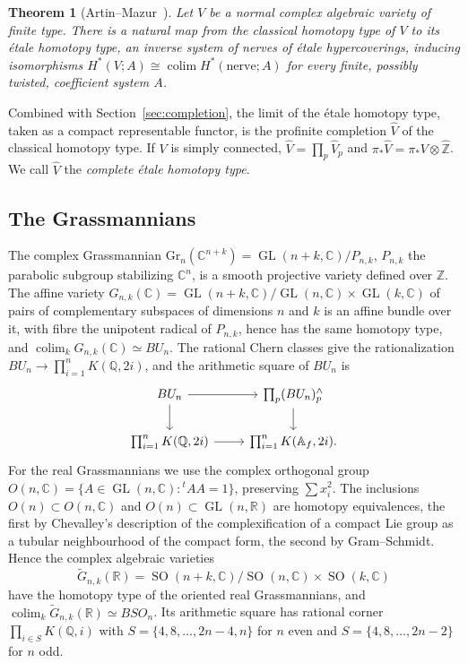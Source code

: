 \documentclass[11pt]{amsart}
\theoremstyle{plain}
\newtheorem{theorem}{Theorem}[section]
\theoremstyle{definition}
\numberwithin{equation}{section}
\newcommand{\Z}{\mathbb{Z}}
\newcommand{\Q}{\mathbb{Q}}
\newcommand{\R}{\mathbb{R}}
\newcommand{\C}{\mathbb{C}}
\newcommand{\Zhat}{\widehat{\mathbb{Z}}}
\newcommand{\Af}{\mathbb{A}_f}
\DeclareMathOperator{\colim}{colim}
\DeclareMathOperator{\GL}{GL}
\DeclareMathOperator{\SO}{SO}
\begin{document}
\begin{theorem}[Artin--Mazur~\cite{ArtinMazur}]\label{thm:artinmazur}
Let $V$ be a normal complex algebraic variety of finite type.
There is a natural map from the classical homotopy type of $V$ to its \'etale homotopy type, an inverse system of nerves of \'etale hypercoverings, inducing isomorphisms $H^*(V;A)\cong\colim H^*(\text{nerve};A)$ for every finite, possibly twisted, coefficient system $A$.
\end{theorem}

Combined with Section~\ref{sec:completion}, the limit of the \'etale homotopy type, taken as a compact representable functor, is the profinite completion $\widehat V$ of the classical homotopy type.
If $V$ is simply connected, $\widehat V=\prod_p\widehat V_p$ and $\pi_*\widehat V=\pi_*V\otimes\Zhat$.
We call $\widehat V$ the \emph{complete \'etale homotopy type}.

\subsection{The Grassmannians}
The complex Grassmannian $\mathrm{Gr}_n(\C^{n+k})=\GL(n+k,\C)/P_{n,k}$, $P_{n,k}$ the parabolic subgroup stabilizing $\C^n$, is a smooth projective variety defined over $\Z$.
The affine variety $G_{n,k}(\C)=\GL(n+k,\C)/\GL(n,\C)\times\GL(k,\C)$ of pairs of complementary subspaces of dimensions $n$ and $k$ is an affine bundle over it, with fibre the unipotent radical of $P_{n,k}$, hence has the same homotopy type, and $\colim_kG_{n,k}(\C)\simeq BU_n$.
The rational Chern classes give the rationalization $BU_n\to\prod_{i=1}^nK(\Q,2i)$, and the arithmetic square of $BU_n$ is
\[
\begin{tikzcd}
BU_n\arrow[r]\arrow[d] & \prod_p(BU_n)^\wedge_p\arrow[d]\\
\prod_{i=1}^nK(\Q,2i)\arrow[r] & \prod_{i=1}^nK(\Af,2i).
\end{tikzcd}
\]
For the real Grassmannians we use the complex orthogonal group $O(n,\C)=\{A\in\GL(n,\C):{}^tAA=1\}$, preserving $\sum x_i^2$.
The inclusions $O(n)\subset O(n,\C)$ and $O(n)\subset\GL(n,\R)$ are homotopy equivalences, the first by Chevalley's description of the complexification of a compact Lie group as a tubular neighbourhood of the compact form, the second by Gram--Schmidt.
Hence the complex algebraic varieties
\[
\widetilde G_{n,k}(\R)=\SO(n+k,\C)/\SO(n,\C)\times\SO(k,\C)
\]
have the homotopy type of the oriented real Grassmannians, and $\colim_k\widetilde G_{n,k}(\R)\simeq BSO_n$.
Its arithmetic square has rational corner $\prod_{i\in S}K(\Q,i)$ with $S=\{4,8,\dots,2n-4,n\}$ for $n$ even and $S=\{4,8,\dots,2n-2\}$ for $n$ odd.
\end{document}
